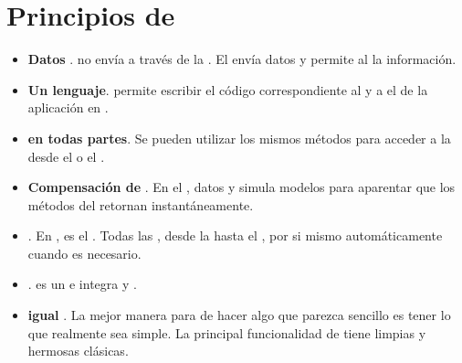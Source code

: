 \section{Principios de \meteor}
\begin{itemize}
	\item \textbf{Datos \onthewire}. \meteor no envía \html a través de la \network. El \serverAS envía datos y permite al \client \render la información.

	\item \textbf{Un lenguaje}. \meteor permite escribir el código correspondiente al \client y a el \serverAS de la aplicación en \javaScript.
	\item \textbf{\dataBase en todas partes}. Se pueden utilizar los mismos métodos para acceder a la \dataBase desde el \client o el \server.

	\item \textbf{Compensación de \latency}. En el \client, \meteor \prefetches datos y simula modelos para aparentar que los métodos del \serverAS retornan instantáneamente.

	\item \textbf{\fullstack \reactivity}. En \meteor, \realtime es el . Todas las \layers, desde la \dataBase hasta el \template, \update por si mismo automáticamente cuando es necesario.

	\item \textbf{\embraceecosystem}. \meteor es un \openSource e integra \tools y \frameworks \openSource.

	\item \textbf{\simplicity igual \productivity}. La mejor manera para de hacer algo que parezca sencillo es tener lo que realmente sea simple. La principal funcionalidad de \meteor tiene limpias y hermosas \apis clásicas.

\end{itemize}


